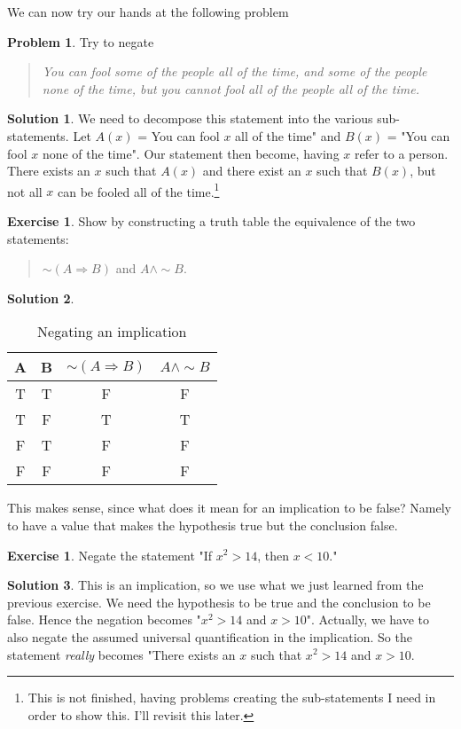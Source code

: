 \documentclass[a4paper, 11pt]{report}
\theoremstyle{plain}
\theoremstyle{definition}
\newtheorem{exrc}[thm]{Exercise}
\newtheorem{prbl}[thm]{Problem}
\newtheorem*{sltn}{Solution}
\newcommand{\impl}{\Longrightarrow}
\renewcommand{\neg}{{\sim}} %
\begin{document}
  We can now try our hands at the following problem
  \begin{prbl}
    Try to negate
    \begin{quote}
      \textit{You can fool some of the people all of the time, and some of the
      people none of the time, but you cannot fool all of the people all of the
    time.}
    \end{quote}
  \end{prbl}

  \begin{sltn}
    We need to decompose this statement into the various sub-statements.  Let
    $A(x)$ = You can fool $x$ all of the time" and $B(x)$ = "You can fool $x$
    none of the time". Our statement then become, having $x$ refer to a person.
    There exists an $x$ such that $A(x)$ and there exist an $x$ such that
    $B(x)$, but not all $x$ can be fooled all of the time.\footnote{This is not
    finished, having problems creating the sub-statements I need in order to
  show this. I'll revisit this later.}
  \end{sltn}
 
  \pagebreak
  \begin{exrc}
    Show by constructing a truth table the equivalence of the two statements:
    \begin{quote}
      $\neg (A \impl B)$ and $A \land \neg B$.
    \end{quote}
  \end{exrc}
  \begin{sltn}
    \begin{table}[h!]
      \centering
      \caption{Negating an implication}
      \begin{tabular}{cccc}
        \hline
        A & B & $ \neg(A \impl B)$ & $A \land \neg B$\\
        \hline
        T& T& F& F\\
        T& F& T& T\\
        F& T& F& F\\
        F& F& F& F\\
        \hline
      \end{tabular}
    \end{table}
    This makes sense, since what does it mean for an implication to be false?
    Namely to have a value that makes the hypothesis true but the conclusion
    false.
  \end{sltn}
  \begin{exrc}
    Negate the statement "If $x^2 > 14$, then $x < 10$."
  \end{exrc}
  \begin{sltn}
    This is an implication, so we use what we just learned from the previous
    exercise. We need the hypothesis to be true and the conclusion to be false.
    Hence the negation becomes "$x ^2 > 14$ and $x > 10$". Actually, we have to
    also negate the assumed universal quantification in the implication. So the
    statement \textit{really} becomes "There exists an $x$ such that $x ^ 2 >
    14$ and $x > 10$.
  \end{sltn}
\end{document}
